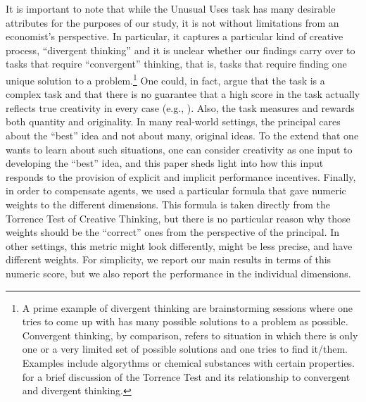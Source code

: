  It is important to note that while the Unusual Uses task has many desirable attributes
 for the purposes of our study, it is not without limitations from an economist's perspective. 
In particular, it  captures a particular kind of creative process, ``divergent thinking'' and it is unclear whether 
our findings carry over to tasks that require ``convergent'' thinking, that is, 
tasks that require finding one unique solution to a problem.\footnote{A prime example of 
divergent thinking are brainstorming sessions where one tries to come up with has many possible 
solutions to a problem as possible. Convergent thinking, by comparison, refers to situation in which there is only one
or a very limited set of possible solutions and one tries to find it/them. Examples include algorythms or chemical 
substances with certain properties. \cite{kim2006} for a brief discussion of the Torrence Test and its relationship to
convergent and divergent thinking.
} One could, in fact, 
argue that the task is a complex task and that there is no guarantee 
that a high score in the task actually reflects true creativity in every case (e.g., \citealp{kim2006}). 
Also, the task measures and rewards both 
quantity and originality. In many real-world settings, the principal cares about 
the ``best'' idea and not about many, original ideas. To the extend that one wants to learn 
about such situations, one can consider creativity as one input to 
developing the ``best'' idea, and this paper sheds light into how this input responds to the provision 
of explicit and implicit performance incentives. 
Finally,  in order to compensate agents, we used a particular formula that gave numeric 
weights to the different dimensions. This formula is taken directly from the Torrence Test of 
Creative Thinking, but there is no particular reason why those 
weights should be the ``correct'' ones from the perspective of the principal. 
In other settings, this metric might look differently, might be less precise, 
and have different weights. For simplicity, we report our 
main results in terms of this numeric score, but we also report the performance in the individual dimensions.   






